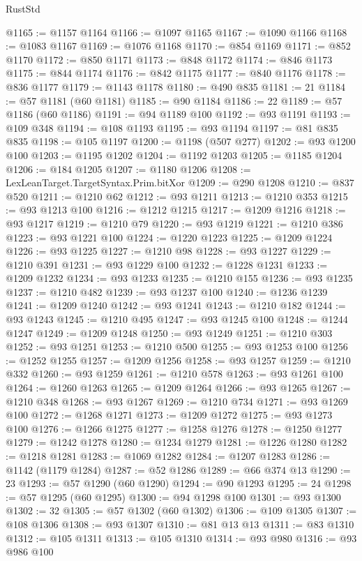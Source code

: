 \begin{lexlean}{RustStd}
\begin{coremodule}
@1165 := @1157 @1164
@1166 := @1097 @1165
@1167 := @1090 @1166
@1168 := @1083 @1167
@1169 := @1076 @1168
@1170 := @854 @1169
@1171 := @852 @1170
@1172 := @850 @1171
@1173 := @848 @1172
@1174 := @846 @1173
@1175 := @844 @1174
@1176 := @842 @1175
@1177 := @840 @1176
@1178 := @836 @1177
@1179 := @1143 @1178
@1180 := @490 @835
@1181 := 21
@1184 := @57 @1181 (@60 @1181)
@1185 := @90 @1184
@1186 := 22
@1189 := @57 @1186 (@60 @1186)
@1191 := @94 @1189 @100
@1192 := @93 @1191
@1193 := @109 @348
@1194 := @108 @1193
@1195 := @93 @1194
@1197 := @81 @835 @835
@1198 := @105 @1197
@1200 := @1198 (@507 @277)
@1202 := @93 @1200 @100
@1203 := @1195 @1202
@1204 := @1192 @1203
@1205 := @1185 @1204
@1206 := @184 @1205
@1207 := @1180 @1206
@1208 := LexLeanTarget.TargetSyntax.Prim.bitXor
@1209 := @290 @1208
@1210 := @837 @520
@1211 := @1210 @62
@1212 := @93 @1211
@1213 := @1210 @353
@1215 := @93 @1213 @100
@1216 := @1212 @1215
@1217 := @1209 @1216
@1218 := @93 @1217
@1219 := @1210 @79
@1220 := @93 @1219
@1221 := @1210 @386
@1223 := @93 @1221 @100
@1224 := @1220 @1223
@1225 := @1209 @1224
@1226 := @93 @1225
@1227 := @1210 @98
@1228 := @93 @1227
@1229 := @1210 @391
@1231 := @93 @1229 @100
@1232 := @1228 @1231
@1233 := @1209 @1232
@1234 := @93 @1233
@1235 := @1210 @155
@1236 := @93 @1235
@1237 := @1210 @482
@1239 := @93 @1237 @100
@1240 := @1236 @1239
@1241 := @1209 @1240
@1242 := @93 @1241
@1243 := @1210 @182
@1244 := @93 @1243
@1245 := @1210 @495
@1247 := @93 @1245 @100
@1248 := @1244 @1247
@1249 := @1209 @1248
@1250 := @93 @1249
@1251 := @1210 @303
@1252 := @93 @1251
@1253 := @1210 @500
@1255 := @93 @1253 @100
@1256 := @1252 @1255
@1257 := @1209 @1256
@1258 := @93 @1257
@1259 := @1210 @332
@1260 := @93 @1259
@1261 := @1210 @578
@1263 := @93 @1261 @100
@1264 := @1260 @1263
@1265 := @1209 @1264
@1266 := @93 @1265
@1267 := @1210 @348
@1268 := @93 @1267
@1269 := @1210 @734
@1271 := @93 @1269 @100
@1272 := @1268 @1271
@1273 := @1209 @1272
@1275 := @93 @1273 @100
@1276 := @1266 @1275
@1277 := @1258 @1276
@1278 := @1250 @1277
@1279 := @1242 @1278
@1280 := @1234 @1279
@1281 := @1226 @1280
@1282 := @1218 @1281
@1283 := @1069 @1282
@1284 := @1207 @1283
@1286 := @1142 (@1179 @1284)
@1287 := @52 @1286
@1289 := @66 @374 @13
@1290 := 23
@1293 := @57 @1290 (@60 @1290)
@1294 := @90 @1293
@1295 := 24
@1298 := @57 @1295 (@60 @1295)
@1300 := @94 @1298 @100
@1301 := @93 @1300
@1302 := 32
@1305 := @57 @1302 (@60 @1302)
@1306 := @109 @1305
@1307 := @108 @1306
@1308 := @93 @1307
@1310 := @81 @13 @13
@1311 := @83 @1310
@1312 := @105 @1311
@1313 := @105 @1310
@1314 := @93 @980
@1316 := @93 @986 @100

\end{coremodule}
\end{lexlean}
